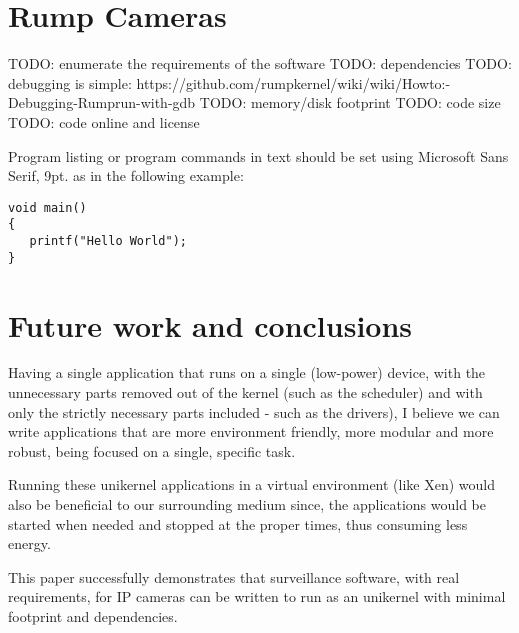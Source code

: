 \documentclass[10pt,a4paper,twoside]{article}
\begin{document}
\section{Rump Cameras}
TODO: enumerate the requirements of the software
TODO: dependencies
TODO: debugging is simple: https://github.com/rumpkernel/wiki/wiki/Howto:-Debugging-Rumprun-with-gdb
TODO: memory/disk footprint
TODO: code size
TODO: code online and license


Program listing or program commands in text should be set using
Microsoft Sans Serif, 9pt. as in the following example:
\begin{verbatim}
void main()
{
   printf("Hello World");
}
\end{verbatim}

\section{Future work and conclusions}
Having a single application that runs on a single (low-power) device, with the unnecessary parts removed out
of the kernel (such as the scheduler) and with only the strictly necessary parts included - such as the drivers),
I believe we can write applications that are more environment friendly,
more modular and more robust, being focused on a single, specific task.

Running these unikernel applications in a virtual environment (like Xen) would also be
beneficial to our surrounding medium since, the applications would be started when
needed and stopped at the proper times, thus consuming less energy. \cite{DataCenterEnergyForeCast} \cite{JinWenChen}

This paper successfully demonstrates that surveillance software, with real requirements,
 for IP cameras can be written to run as an unikernel with minimal footprint and dependencies.
\end{document}
